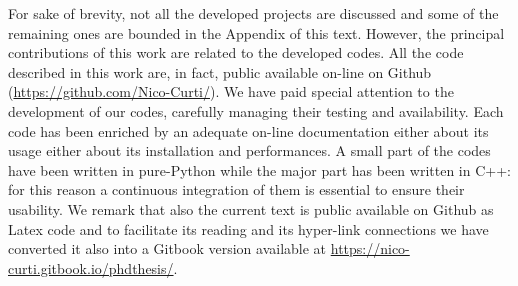 \documentclass{standalone}
\begin{document}
For sake of brevity, not all the developed projects are discussed and some of the remaining ones are bounded in the Appendix of this text.
However, the principal contributions of this work are related to the developed codes.
All the code described in this work are, in fact, public available on-line on Github (\url{https://github.com/Nico-Curti/}).
We have paid special attention to the development of our codes, carefully managing their testing and availability.
Each code has been enriched by an adequate on-line documentation either about its usage either about its installation and performances.
A small part of the codes have been written in pure-\textsf{Python} while the major part has been written in \textsf{C++}: for this reason a continuous integration of them is essential to ensure their usability.
We remark that also the current text is public available on Github as \textsf{Latex} code and to facilitate its reading and its hyper-link connections we have converted it also into a \textsf{Gitbook} version available at \url{https://nico-curti.gitbook.io/phdthesis/}.




\end{document}
